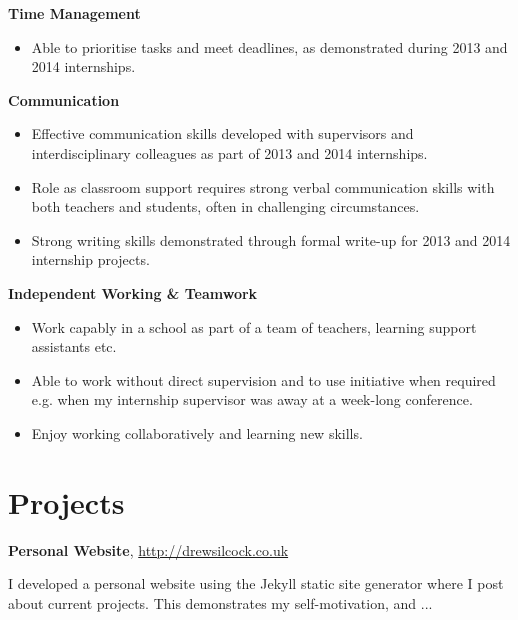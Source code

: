 \documentclass[11pt,a4paper,sans]{moderncv}
\begin{document}
{\large\textbf{Time Management}}

\begin{itemize}
\item Able to prioritise tasks and meet deadlines, as demonstrated during 2013
    and 2014 internships.
\end{itemize}

\vspace{1em}

{\large\textbf{Communication}}

\begin{itemize}
\item Effective communication skills developed with supervisors and
    interdisciplinary colleagues as part of 2013 and 2014 internships.
\item Role as classroom support requires strong verbal communication skills with
    both teachers and students, often in challenging circumstances.
\item Strong writing skills demonstrated through formal write-up for 2013 and
    2014 internship projects.
\end{itemize}

\vspace{1em}

{\large\textbf{Independent Working \& Teamwork}}

\begin{itemize}
\item Work capably in a school as part of a team of teachers, learning support
    assistants etc.
\item Able to work without direct supervision and to use initiative when
    required e.g. when my internship supervisor was away at a week-long
    conference.
\item Enjoy working collaboratively and learning new skills.
\end{itemize}

\section{Projects}

{\large\textbf{Personal Website}, \color{blue}
\href{http://drewsilcock.co.uk}{http://drewsilcock.co.uk}}

I developed a personal website using the Jekyll static site generator where I
post about current projects. This demonstrates my self-motivation, and ...

\vspace{0.75em}
\end{document}
